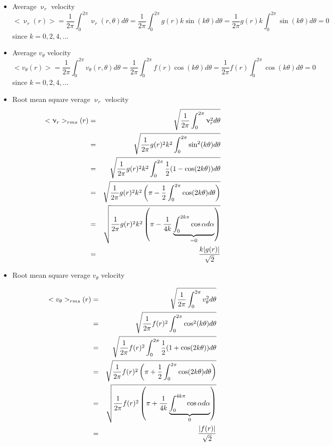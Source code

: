 \begin{itemize}
\item Average $\upnu_r$ velocity
\[
<\upnu_r(r)> =\frac{1}{2\pi}\int_0^{2\pi} \upnu_r(r,\theta) d\theta
=\frac{1}{2\pi}\int_0^{2\pi}  g(r) k \sin(k \theta) d\theta
=\frac{1}{2\pi}g(r) k \int_0^{2\pi}  \sin(k \theta) d\theta = 0
\]
since $k=0,2,4,...$

\item Average $v_\theta$ velocity
\[
<v_\theta(r)>
=\frac{1}{2\pi}\int_0^{2\pi} v_\theta(r,\theta) d\theta
=\frac{1}{2\pi}\int_0^{2\pi} f(r) \cos(k \theta) d\theta
=\frac{1}{2\pi}f(r)\int_0^{2\pi}  \cos(k \theta) d\theta
=0
\]
since $k=0,2,4,...$

\item Root mean square verage $\upnu_r$ velocity
\begin{eqnarray}
<\upnu_r>_{rms}(r) 
&=& \sqrt{\frac{1}{2\pi} \int_0^{2\pi} \upnu_r^2 d\theta }   \nonumber\\
&=& \sqrt{\frac{1}{2\pi} g(r)^2 k^2\int_0^{2\pi} \sin^2 (k \theta) d\theta }   \nonumber\\
&=& \sqrt{\frac{1}{2\pi} g(r)^2 k^2\int_0^{2\pi} \frac{1}{2}(1-\cos (2k\theta)  ) d\theta }   \nonumber\\
&=& \sqrt{\frac{1}{2\pi} g(r)^2 k^2  \left(\pi - \frac{1}{2}  \int_0^{2\pi} \cos (2k\theta)   d\theta \right) }   \nonumber\\
&=& \sqrt{\frac{1}{2\pi} g(r)^2 k^2  \left(\pi - \frac{1}{4k} \underbrace{ \int_0^{2k\pi} \cos \alpha   d\alpha}_{=0} \right) }   \nonumber\\
&=& \frac{k|g(r)|}{\sqrt{2}} 
\end{eqnarray}

\item Root mean square verage $v_\theta$ velocity

\begin{eqnarray}
<v_\theta>_{rms}(r) 
&=& \sqrt{\frac{1}{2\pi} \int_0^{2\pi} v_\theta^2 d\theta }   \nonumber\\
&=& \sqrt{\frac{1}{2\pi} f(r)^2 \int_0^{2\pi} \cos^2(k \theta) d\theta }  \nonumber\\
&=& \sqrt{\frac{1}{2\pi} f(r)^2 \int_0^{2\pi}  \frac{1}{2}(1 + \cos (2k\theta))   d\theta }  \nonumber\\
&=& \sqrt{\frac{1}{2\pi} f(r)^2 \left( \pi + \frac{1}{2} \int_0^{2\pi}   \cos (2k\theta) d\theta \right)  }  \nonumber\\
&=& \sqrt{\frac{1}{2\pi} f(r)^2 \left( \pi + \frac{1}{4k} \underbrace{\int_0^{4k\pi}   \cos \alpha d\alpha}_{0} \right)  }  \nonumber\\
&=& \frac{|f(r)|}{\sqrt{2}}
\end{eqnarray}


\end{itemize}
